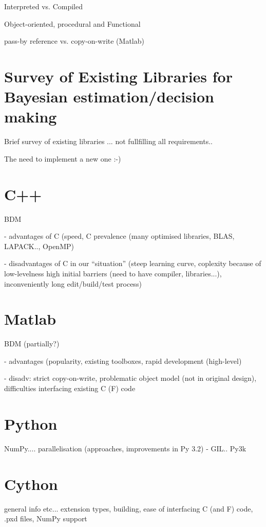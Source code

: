 \documentclass[a4paper,12pt,oneside]{report}
\begin{document}
Interpreted vs. Compiled

Object-oriented, procedural and Functional

pass-by reference vs. copy-on-write (Matlab)

\section{Survey of Existing Libraries for Bayesian estimation/decision making}

Brief survey of existing libraries ... not fullfilling all requirements..

The need to implement a new one :-)

\section{C++}

BDM

 - advantages of C (speed, C prevalence (many optimised libraries, BLAS, LAPACK.., OpenMP)

 - disadvantages of C in our ``situation'' (steep learning curve, coplexity because of low-levelness
   high initial barriers (need to have compiler, libraries...), inconveniently long edit/build/test
   process)

\section{Matlab}

BDM (partially?)

 - advantages (popularity, existing toolboxes, rapid development (high-level)

 - disadv: strict copy-on-write, problematic object model (not in original design), difficulties
           interfacing existing C (F) code

\section{Python}

NumPy.... parallelisation (approaches, improvements in Py 3.2) - GIL.. Py3k

\section{Cython}

general info etc... extension types, building, ease of interfacing C (and F) code, .pxd files,
NumPy support
\end{document}
